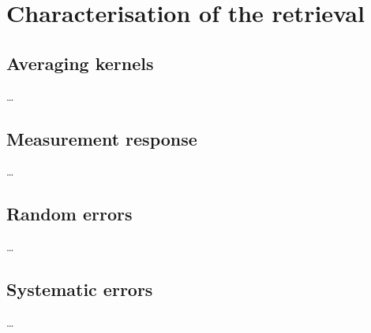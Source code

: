\chapter{Characterisation of the retrieval}
\label{chapter:characterisation}

\section{Averaging kernels}
\label{sec:A}
%
\dots


\section{Measurement response}
\label{sec:mresp}
%
\dots


\section{Random errors}
\label{sec:erand}
%
\dots


\section{Systematic errors}
\label{sec:esyst}
%
\dots





